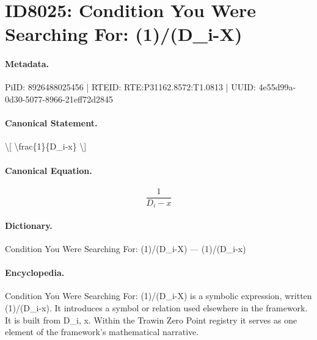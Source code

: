 \section*{ID8025: Condition You Were Searching For: (1)/(D\_i-X)}
\paragraph{Metadata.}
PiID: 8926488025456 | RTEID: RTE:P31162.8572:T1.0813 | UUID: 4e55d99a-0d30-5077-8966-21eff72d2845

\paragraph{Canonical Statement.}
\textbackslash{}[ \textbackslash{}frac\{1\}\{D\_i-x\} \textbackslash{}]

\paragraph{Canonical Equation.}
\[
\frac{1}{D_i-x}
\]

\paragraph{Dictionary.}
Condition You Were Searching For: (1)/(D\_i-X) — (1)/(D\_i-x)

\paragraph{Encyclopedia.}
Condition You Were Searching For: (1)/(D\_i-X) is a symbolic expression, written (1)/(D\_i-x). It introduces a symbol or relation used elsewhere in the framework. It is built from D\_i, x. Within the Trawin Zero Point registry it serves as one element of the framework's mathematical narrative.
